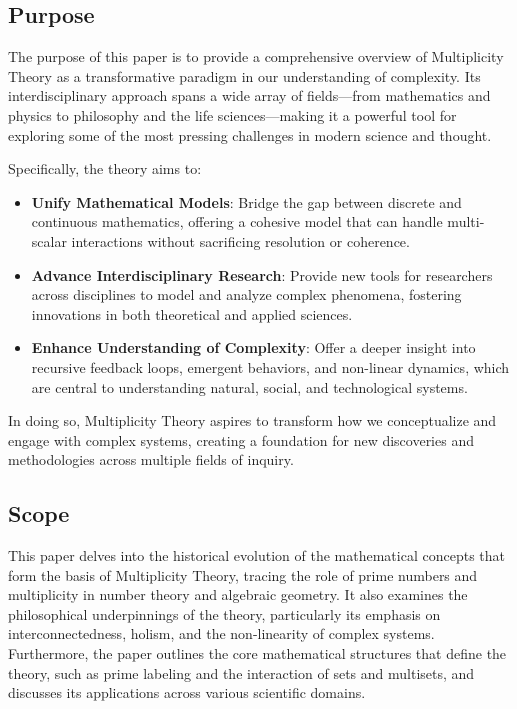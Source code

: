 \documentclass[12pt]{article}
\begin{document}
\subsection{Purpose}
The purpose of this paper is to provide a comprehensive overview of Multiplicity Theory as a transformative paradigm in our understanding of complexity. Its interdisciplinary approach spans a wide array of fields—from mathematics and physics to philosophy and the life sciences—making it a powerful tool for exploring some of the most pressing challenges in modern science and thought.

Specifically, the theory aims to:
\begin{itemize}
    \item \textbf{Unify Mathematical Models}: Bridge the gap between discrete and continuous mathematics, offering a cohesive model that can handle multi-scalar interactions without sacrificing resolution or coherence.
    \item \textbf{Advance Interdisciplinary Research}: Provide new tools for researchers across disciplines to model and analyze complex phenomena, fostering innovations in both theoretical and applied sciences.
    \item \textbf{Enhance Understanding of Complexity}: Offer a deeper insight into recursive feedback loops, emergent behaviors, and non-linear dynamics, which are central to understanding natural, social, and technological systems.
\end{itemize}
In doing so, Multiplicity Theory aspires to transform how we conceptualize and engage with complex systems, creating a foundation for new discoveries and methodologies across multiple fields of inquiry.

\subsection{Scope}
This paper delves into the historical evolution of the mathematical concepts that form the basis of Multiplicity Theory, tracing the role of prime numbers and multiplicity in number theory and algebraic geometry. It also examines the philosophical underpinnings of the theory, particularly its emphasis on interconnectedness, holism, and the non-linearity of complex systems. Furthermore, the paper outlines the core mathematical structures that define the theory, such as prime labeling and the interaction of sets and multisets, and discusses its applications across various scientific domains.
\end{document}

